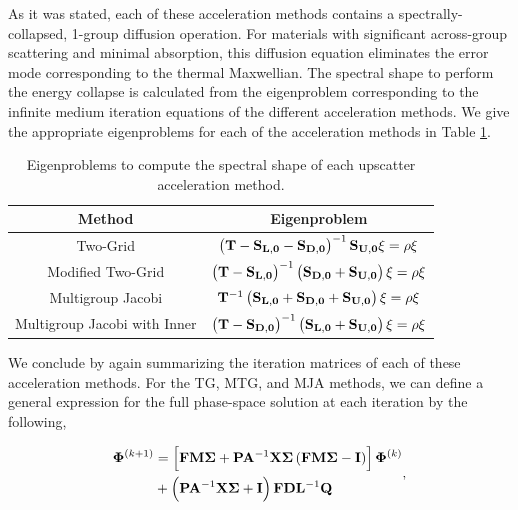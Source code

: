As it was stated, each of these acceleration methods contains a spectrally-collapsed, 1-group diffusion operation. For materials with significant across-group scattering and minimal absorption, this diffusion equation eliminates the error mode corresponding to the thermal Maxwellian. The spectral shape to perform the energy collapse is calculated from the eigenproblem corresponding to the infinite medium iteration equations of the different acceleration methods. We give the appropriate eigenproblems for each of the acceleration methods in Table \ref{tab::DSA_DSA_MG_Summary_diffterms}.

\begin{table}
\centering
\caption{Eigenproblems to compute the spectral shape of each upscatter acceleration method.}
\def\arraystretch{1.5}
\begin{tabular}{|c|c|} \hline
Method &  Eigenproblem \\ \hline \hline
Two-Grid & $\left(  {\bf T} - {\bf S_{L,0}} - {\bf S_{D,0}} \right)^{-1} {\bf S_{U,0}} \xi = \rho \xi$ \\ \hline
Modified Two-Grid & $\left(  {\bf T} - {\bf S_{L,0}}  \right)^{-1} \left( {\bf S_{D,0}}+ {\bf S_{U,0}} \right)\xi = \rho \xi $ \\ \hline
Multigroup Jacobi &${\bf T}^{-1} \left( {\bf S_{L,0}}+{\bf S_{D,0}} +  {\bf S_{U,0}} \right)\xi = \rho \xi$   \\ \hline
Multigroup Jacobi with Inner & $\left(  {\bf T} - {\bf S_{D,0}} \right)^{-1} \left( {\bf S_{L,0}} +  {\bf S_{U,0}} \right)\xi = \rho \xi$ \\ \hline
\end{tabular}
\label{tab::DSA_DSA_MG_Summary_diffterms}
\end{table}

We conclude by again summarizing the iteration matrices of each of these acceleration methods. For the TG, MTG, and MJA methods, we can define a general expression for the full phase-space solution at each iteration by the following,

\begin{equation}
\label{eq::DSA_MG_Summary_form}
\begin{aligned}
{\bf \Phi}^{(k+1)} &= \left[ {\bf F} {\bf M} {\bf \Sigma} + {\bf P} {\bf A}^{-1}  {\bf X} {\bf \Sigma} \left(  {\bf F} {\bf M} {\bf \Sigma} - {\bf I} \right)  \right]   {\bf \Phi}^{(k)} \\
&+ \left(  {\bf P} {\bf A}^{-1}  {\bf X} {\bf \Sigma}  + {\bf I} \right) {\bf F} {\bf D}{\bf L}^{-1}  {\bf Q}
\end{aligned} ,
\end{equation}


